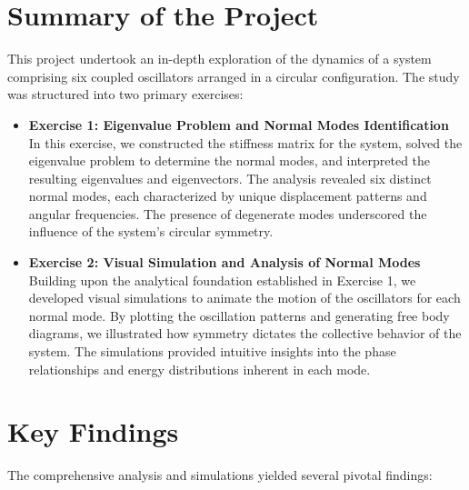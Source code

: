 \documentclass[12pt]{report} %
\begin{document}
\newpage


\section{Summary of the Project}
\label{sec:conclusion_summary}

This project undertook an in-depth exploration of the dynamics of a system comprising six coupled oscillators arranged in a circular configuration. The study was structured into two primary exercises:

\begin{itemize}
    \item \textbf{Exercise 1: Eigenvalue Problem and Normal Modes Identification} \\
    In this exercise, we constructed the stiffness matrix for the system, solved the eigenvalue problem to determine the normal modes, and interpreted the resulting eigenvalues and eigenvectors. The analysis revealed six distinct normal modes, each characterized by unique displacement patterns and angular frequencies. The presence of degenerate modes underscored the influence of the system's circular symmetry.

    \item \textbf{Exercise 2: Visual Simulation and Analysis of Normal Modes} \\
    Building upon the analytical foundation established in Exercise 1, we developed visual simulations to animate the motion of the oscillators for each normal mode. By plotting the oscillation patterns and generating free body diagrams, we illustrated how symmetry dictates the collective behavior of the system. The simulations provided intuitive insights into the phase relationships and energy distributions inherent in each mode.
\end{itemize}

\section{Key Findings}
\label{sec:conclusion_key_findings}

The comprehensive analysis and simulations yielded several pivotal findings:
\end{document}
